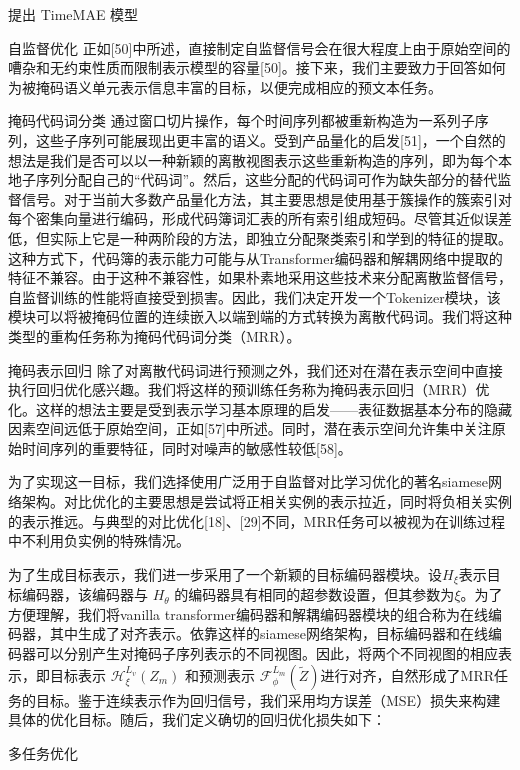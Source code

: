 \documentclass[a4paper,12pt]{article}
\begin{document}
\begin{section}{提出 TimeMAE 模型}
\begin{subsection}{自监督优化}
正如[50]中所述，直接制定自监督信号会在很大程度上由于原始空间的嘈杂和无约束性质而限制表示模型的容量[50]。接下来，我们主要致力于回答如何为被掩码语义单元表示信息丰富的目标，以便完成相应的预文本任务。

\begin{subsubsection}{掩码代码词分类}
通过窗口切片操作，每个时间序列都被重新构造为一系列子序列，这些子序列可能展现出更丰富的语义。受到产品量化的启发[51]，一个自然的想法是我们是否可以以一种新颖的离散视图表示这些重新构造的序列，即为每个本地子序列分配自己的“代码词”。然后，这些分配的代码词可作为缺失部分的替代监督信号。对于当前大多数产品量化方法，其主要思想是使用基于簇操作的簇索引对每个密集向量进行编码，形成代码簿词汇表的所有索引组成短码。尽管其近似误差低，但实际上它是一种两阶段的方法，即独立分配聚类索引和学到的特征的提取。这种方式下，代码簿的表示能力可能与从Transformer编码器和解耦网络中提取的特征不兼容。由于这种不兼容性，如果朴素地采用这些技术来分配离散监督信号，自监督训练的性能将直接受到损害。因此，我们决定开发一个Tokenizer模块，该模块可以将被掩码位置的连续嵌入以端到端的方式转换为离散代码词。我们将这种类型的重构任务称为掩码代码词分类（MRR）。
\end{subsubsection}
\begin{subsubsection}{掩码表示回归}
除了对离散代码词进行预测之外，我们还对在潜在表示空间中直接执行回归优化感兴趣。我们将这样的预训练任务称为掩码表示回归（MRR）优化。这样的想法主要是受到表示学习基本原理的启发——表征数据基本分布的隐藏因素空间远低于原始空间，正如[57]中所述。同时，潜在表示空间允许集中关注原始时间序列的重要特征，同时对噪声的敏感性较低[58]。

为了实现这一目标，我们选择使用广泛用于自监督对比学习优化的著名siamese网络架构。对比优化的主要思想是尝试将正相关实例的表示拉近，同时将负相关实例的表示推远。与典型的对比优化[18]、[29]不同，MRR任务可以被视为在训练过程中不利用负实例的特殊情况。
    
为了生成目标表示，我们进一步采用了一个新颖的目标编码器模块。设$H_\xi$表示目标编码器，该编码器与 $H_\theta$ 的编码器具有相同的超参数设置，但其参数为$\xi$。为了方便理解，我们将vanilla transformer编码器和解耦编码器模块的组合称为在线编码器，其中生成了对齐表示。依靠这样的siamese网络架构，目标编码器和在线编码器可以分别产生对掩码子序列表示的不同视图。因此，将两个不同视图的相应表示，即目标表示 $\mathcal{H}_{\xi}^{L_v}(Z_m)$ 和预测表示 $\mathcal{F}_{\phi}^{L_m}(\widetilde{Z})$进行对齐，自然形成了MRR任务的目标。鉴于连续表示作为回归信号，我们采用均方误差（MSE）损失来构建具体的优化目标。随后，我们定义确切的回归优化损失如下：
\end{subsubsection}
\begin{subsubsection}{多任务优化}

\end{subsubsection}
\end{subsection}
\end{section}
\end{document}
